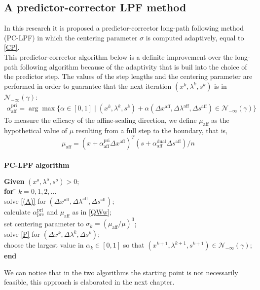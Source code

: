 \documentclass[a4paper,10 pt,titlepage,twoside]{book}
\theoremstyle{plain}
\theoremstyle{definition}
\theoremstyle{remark}
\begin{document}
\subsection*{A predictor-corrector LPF method}
In this research it is proposed a predictor-corrector long-path following method (PC-LPF) in which the centering parameter $\sigma$ is computed adaptively, equal to \ref{CP}.\\
This predictor-corrector algorithm below is a definite improvement over the long-path following algorithm because of the adaptivity that is buil into the choice of the predictor step.
The values of the step lengths and the centering parameter are performed in order to guarantee that the next iteration $(x^{k}, \lambda^{k}, s^{k})$ is in $\mathcal{N}_{-\infty}(\gamma)$:
\begin{align}\label{QWw}
\alpha_{\text{aff}}^{\text{pri}}=\arg\max\{\alpha\in[0,1]\;|\;(x^{k}, \lambda^{k}, s^{k})+ \alpha(\Delta x^{\text{aff}}, \Delta\lambda^{\text{aff}}, \Delta s^{\text{aff}})\in\mathcal{N}_{-\infty}(\gamma)\}
\end{align}
To measure the efficacy of the affine-scaling direction, we define $\mu_{\text{aff}}$ as the hypothetical value of $\mu$ resulting from a full step to the boundary, that is,
\begin{equation*}
\mu_{\text{aff}}= (x+\alpha_{\text{aff}}^{\text{pri}}\Delta x^{\text{aff}})^{T}(s+\alpha_{\text{aff}}^{\text{dual}}\Delta s^{\text{aff}})/n
\end{equation*}
\\
\textbf{PC-LPF algorithm}
\begin{tabbing}
	\textbf{Given} $(x^{o}, \lambda^{o}, s^{o})> 0$; \\
	\textbf{for} \= $k = 0, 1, 2,...$ \\
	\> solve \ref{(A)} for $(\Delta x^{\text{aff}},\Delta \lambda^{\text{aff}},\Delta s^{\text{aff}})$;\\
	\> calculate $\alpha_{\text{pre}}^{\text{pri}}$ and $\mu_{\text{aff}}$ as in \ref{QWw};\\
	\> set centering parameter to $\sigma_{k} = (\mu_{\text{aff}}/\mu)^{3}$; \\
	\> solve \ref{P} for $(\Delta x^{k},\Delta \lambda^{k},\Delta s^{k})$;\\
	\> choose the largest value in $\alpha_{k}\in[0,1]$ so that $(x^{k+1}, \lambda^{k+1}, s^{k+1})\in\mathcal{N}_{-\infty}(\gamma)$;\\
	\textbf{end}
\end{tabbing}
We can notice that in the two algorithms the starting point is not necessarily feasible, this approach is elaborated in the next chapter.
%
\end{document}
